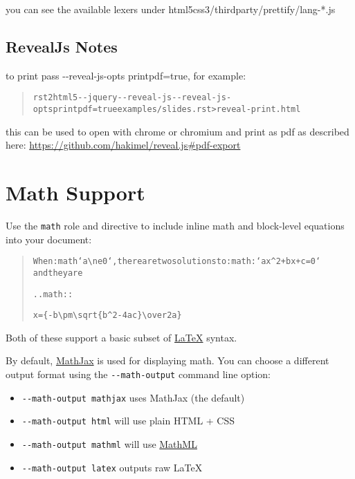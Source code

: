 \documentclass[a4paper]{article}
\begin{document}
you can see the available lexers under html5css3/thirdparty/prettify/lang-*.js


\subsection{RevealJs Notes%
  \label{revealjs-notes}%
}

to print pass -{}-reveal-js-opts printpdf=true, for example:

\begin{quote}
\begin{alltt}
rst2html5 -{}-jquery -{}-reveal-js -{}-reveal-js-opts printpdf=true examples/slides.rst > reveal-print.html
\end{alltt}
\end{quote}

this can be used to open with chrome or chromium and print as pdf as described here: \url{https://github.com/hakimel/reveal.js\#pdf-export}


\section{Math Support%
  \label{math-support}%
}

Use the \texttt{math} role and directive to include inline math and block-level equations into your document:

\begin{quote}
\begin{alltt}
When :math`a \textbackslash{}ne 0`, there are two solutions to :math:`ax^2 + bx + c = 0`
and they are

.. math::

   x = \{-b \textbackslash{}pm \textbackslash{}sqrt\{b^2-4ac\} \textbackslash{}over 2a\}
\end{alltt}
\end{quote}

Both of these support a basic subset of \href{https://www.latex-project.org}{LaTeX} syntax.

By default, \href{https://www.mathjax.org}{MathJax} is used for displaying math. You can choose a different output format using the \texttt{-{}-math-output} command line option:

\begin{itemize}
\item \texttt{-{}-math-output mathjax} uses MathJax (the default)

\item \texttt{-{}-math-output html} will use plain HTML + CSS

\item \texttt{-{}-math-output mathml} will use \href{https://en.wikipedia.org/wiki/MathML}{MathML}

\item \texttt{-{}-math-output latex} outputs raw LaTeX
\end{itemize}
\end{document}
